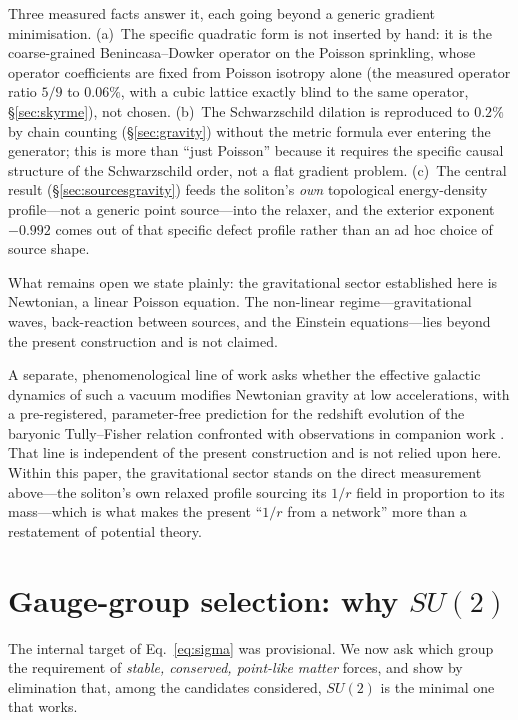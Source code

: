 \documentclass[aps,prd,reprint,nofootinbib,superscriptaddress,floatfix]{revtex4-2}
\theoremstyle{plain}
\newcommand{\su}[1]{SU(#1)}
\begin{document}
Three measured facts answer it, each going beyond a generic gradient minimisation.
(a)~The specific quadratic form is not inserted by hand: it is the coarse-grained
Benincasa--Dowker operator on the Poisson sprinkling, whose operator coefficients are
fixed from Poisson isotropy alone (the measured operator ratio $5/9$ to $0.06\%$, with
a cubic lattice exactly blind to the same operator, \S\ref{sec:skyrme}), not chosen.
(b)~The Schwarzschild dilation is reproduced to $0.2\%$ by chain counting
(\S\ref{sec:gravity}) without the metric formula ever entering the generator; this is
more than ``just Poisson'' because it requires the specific causal structure of the
Schwarzschild order, not a flat gradient problem. (c)~The central result
(\S\ref{sec:sourcesgravity}) feeds the soliton's \emph{own} topological energy-density
profile---not a generic point source---into the relaxer, and the exterior exponent
$-0.992$ comes out of that specific defect profile rather than an ad hoc choice of
source shape.

What remains open we state plainly: the gravitational sector established here is
Newtonian, a linear Poisson equation. The non-linear regime---gravitational waves,
back-reaction between sources, and the Einstein equations---lies beyond the present
construction and is not claimed.

A separate, phenomenological line of work asks whether the effective galactic
dynamics of such a vacuum modifies Newtonian gravity at low accelerations, with a
pre-registered, parameter-free prediction for the redshift evolution of the baryonic
Tully--Fisher relation confronted with observations in companion work
\cite{BTFRMNRAS}. That line is independent of the present construction and is not
relied upon here. Within this paper, the gravitational sector stands on the direct
measurement above---the soliton's own relaxed profile sourcing its $1/r$ field in
proportion to its mass---which is what makes the present ``$1/r$ from a network''
more than a restatement of potential theory.

\section{Gauge-group selection: why \texorpdfstring{$\su2$}{SU(2)}}\label{sec:group}

The internal target of Eq.~\eqref{eq:sigma} was provisional. We now ask which group
the requirement of \emph{stable, conserved, point-like matter} forces, and show by
elimination that, among the candidates considered, $\su2$ is the minimal one that
works.
\end{document}
